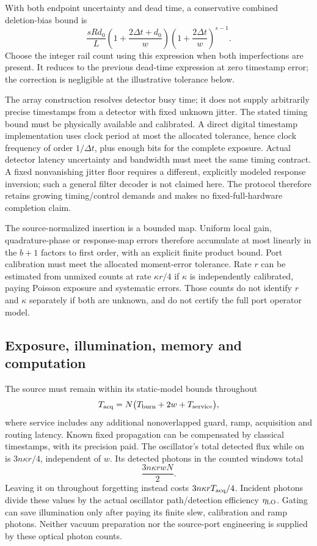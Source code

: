 \documentclass[11pt]{article}
\begin{document}
With both endpoint uncertainty and dead time, a conservative combined deletion-bias bound is
\[
 \frac{sRd_0}{L}\left(1+\frac{2\Delta t+d_0}{w}\right)
 \left(1+\frac{2\Delta t}{w}\right)^{s-1}.
\]
Choose the integer rail count using this expression when both imperfections are present. It reduces to the previous dead-time expression at zero timestamp error; the correction is negligible at the illustrative tolerance below.

The array construction resolves detector busy time; it does not supply arbitrarily precise timestamps from a detector with fixed unknown jitter. The stated timing bound must be physically available and calibrated. A direct digital timestamp implementation uses clock period at most the allocated tolerance, hence clock frequency of order \(1/\Delta t\), plus enough bits for the complete exposure. Actual detector latency uncertainty and bandwidth must meet the same timing contract. A fixed nonvanishing jitter floor requires a different, explicitly modeled response inversion; such a general filter decoder is not claimed here. The protocol therefore retains growing timing/control demands and makes no fixed-full-hardware completion claim.

The source-normalized insertion is a bounded map. Uniform local gain, quadrature-phase or response-map errors therefore accumulate at most linearly in the \(b+1\) factors to first order, with an explicit finite product bound. Port calibration must meet the allocated moment-error tolerance. Rate \(r\) can be estimated from unmixed counts at rate \(\kappa r/4\) if \(\kappa\) is independently calibrated, paying Poisson exposure and systematic errors. Those counts do not identify \(r\) and \(\kappa\) separately if both are unknown, and do not certify the full port operator model.

\subsection{Exposure, illumination, memory and computation}
The source must remain within its static-model bounds throughout
\[
 T_{\rm acq}=N\bigl(T_{\rm burn}+2w+T_{\rm service}\bigr),
\]
where service includes any additional nonoverlapped guard, ramp, acquisition and routing latency. Known fixed propagation can be compensated by classical timestamps, with its precision paid. The oscillator's total detected flux while on is \(3n\kappa r/4\), independent of \(w\). Its detected photons in the counted windows total
\[
 \frac{3n\kappa rwN}{2}.
\]
Leaving it on throughout forgetting instead costs \(3n\kappa rT_{\rm acq}/4\). Incident photons divide these values by the actual oscillator path/detection efficiency \(\eta_{\rm LO}\). Gating can save illumination only after paying its finite slew, calibration and ramp photons. Neither vacuum preparation nor the source-port engineering is supplied by these optical photon counts.
\end{document}
